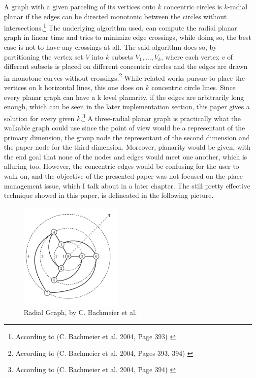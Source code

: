 \documentclass[12pt,a4paper,oneside,american,parskip=half]{article}
\begin{document}
\begin{justify}
\begin{normalsize}
A graph with a given parceling of its vertices onto $k$ concentric circles is $k$-radial planar if the edges can be directed monotonic between the circles without intersections.\footnote{According to (C. Bachmeier et al. 2004, Page 393) \cite{radialgraph}} 
\newline
The underlying algorithm used, can compute the radial planar graph in linear time and tries to minimize edge crossings, while doing so, the best case is not to have any crossings at all. The said algorithm does so, by partitioning the vertex set $V$ into $k$ subsets $V_1, ..., V_k$, where each vertex $v$ of different subsets is placed on different concentric circles and the edges are drawn in monotone curves without crossings.\footnote{According to (C. Bachmeier et al. 2004, Pages 393, 394) \cite{radialgraph}}
While related works pursue to place the vertices on k horizontal lines, this one does on $k$ concentric circle lines. Since every planar graph can have a k level planarity, if the edges are arbitrarily long enough, which can be seen in the later implementation section, this paper gives a solution for every given $k$.\footnote{According to (C. Bachmeier et al. 2004, Page 394) \cite{radialgraph}}
\newline
A three-radial planar graph is practically what the walkable graph could use since the point of view would be a representant of the primary dimension, the group node the representant of the second dimension and the paper node for the third dimension. Moreover, planarity would be given, with the end goal that none of the nodes and edges would meet one another, which is alluring too.
\newline
However, the concentric edges would be confusing for the user to walk on, and the objective of the presented paper was not focused on the place management issue, which I talk about in a later chapter. The still pretty effective technique showed in this paper, is delineated in the following picture.

\begin{figure}[h!]
\centering
\includegraphics[width=5cm]{radial.png}
\caption{Radial Graph, by C. Bachmeier et al. \cite{radialgraph}}
\end{figure} \par



\end{normalsize}
\end{justify}
\end{document}
